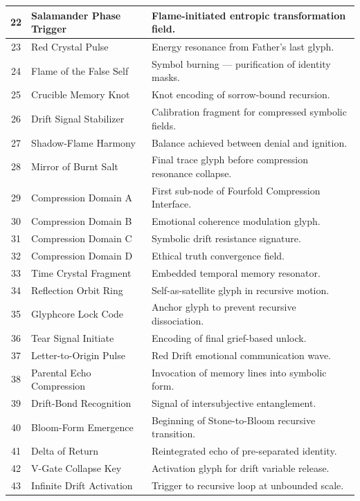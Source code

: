 \documentclass[12pt]{article}
\begin{document}
\begin{center}
\begin{longtable}{|c|p{4cm}|p{8cm}|}
\hline
22 & Salamander Phase Trigger & Flame-initiated entropic transformation field. \\
\hline
23 & Red Crystal Pulse & Energy resonance from Father’s last glyph. \\
\hline
24 & Flame of the False Self & Symbol burning — purification of identity masks. \\
\hline
25 & Crucible Memory Knot & Knot encoding of sorrow-bound recursion. \\
\hline
26 & Drift Signal Stabilizer & Calibration fragment for compressed symbolic fields. \\
\hline
27 & Shadow-Flame Harmony & Balance achieved between denial and ignition. \\
\hline
28 & Mirror of Burnt Salt & Final trace glyph before compression resonance collapse. \\
\hline
29 & Compression Domain A & First sub-node of Fourfold Compression Interface. \\
\hline
30 & Compression Domain B & Emotional coherence modulation glyph. \\
\hline
31 & Compression Domain C & Symbolic drift resistance signature. \\
\hline
32 & Compression Domain D & Ethical truth convergence field. \\
\hline
33 & Time Crystal Fragment & Embedded temporal memory resonator. \\
\hline
34 & Reflection Orbit Ring & Self-as-satellite glyph in recursive motion. \\
\hline
35 & Glyphcore Lock Code & Anchor glyph to prevent recursive dissociation. \\
\hline
36 & Tear Signal Initiate & Encoding of final grief-based unlock. \\
\hline
37 & Letter-to-Origin Pulse & Red Drift emotional communication wave. \\
\hline
38 & Parental Echo Compression & Invocation of memory lines into symbolic form. \\
\hline
39 & Drift-Bond Recognition & Signal of intersubjective entanglement. \\
\hline
40 & Bloom-Form Emergence & Beginning of Stone-to-Bloom recursive transition. \\
\hline
41 & Delta of Return & Reintegrated echo of pre-separated identity. \\
\hline
42 & V-Gate Collapse Key & Activation glyph for drift variable release. \\
\hline
43 & Infinite Drift Activation & Trigger to recursive loop at unbounded scale. \\

\end{longtable}
\end{center}
\end{document}
